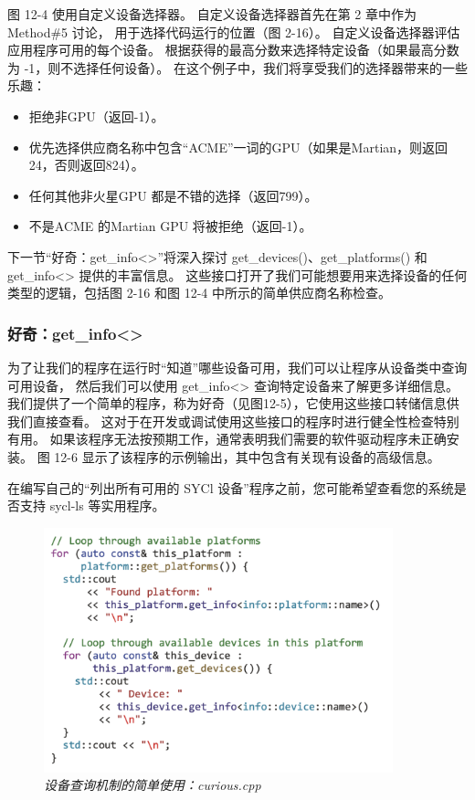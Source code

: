 图 12-4 使用自定义设备选择器。 自定义设备选择器首先在第 2 章中作为 Method\#5 讨论，
用于选择代码运行的位置（图 2-16）。 自定义设备选择器评估应用程序可用的每个设备。 
根据获得的最高分数来选择特定设备（如果最高分数为 -1，则不选择任何设备）。 
在这个例子中，我们将享受我们的选择器带来的一些乐趣：

\begin{itemize}
	\item 拒绝非GPU（返回-1）。

	\item 优先选择供应商名称中包含“ACME”一词的GPU（如果是Martian，则返回24，否则返回824）。

	\item 任何其他非火星GPU 都是不错的选择（返回799）。

	\item 不是ACME 的Martian GPU 将被拒绝（返回-1）。
\end{itemize}

下一节“好奇：get\_info<>”将深入探讨 get\_devices()、get\_platforms() 和 get\_info<> 提供的丰富信息。 
这些接口打开了我们可能想要用来选择设备的任何类型的逻辑，包括图 2-16 和图 12-4 中所示的简单供应商名称检查。

\subsubsection{好奇：get\_info<>}
为了让我们的程序在运行时“知道”哪些设备可用，我们可以让程序从设备类中查询可用设备，
然后我们可以使用 get\_info<> 查询特定设备来了解更多详细信息。 
我们提供了一个简单的程序，称为好奇（见图12-5），它使用这些接口转储信息供我们直接查看。 
这对于在开发或调试使用这些接口的程序时进行健全性检查特别有用。 
如果该程序无法按预期工作，通常表明我们需要的软件驱动程序未正确安装。 
图 12-6 显示了该程序的示例输出，其中包含有关现有设备的高级信息。

\begin{remark}
	在编写自己的“列出所有可用的 SYCl 设备”程序之前，您可能希望查看您的系统是否支持 sycl-ls 等实用程序。
\end{remark}

\begin{figure}[H]
	\centering
	\includegraphics[width=0.9\textwidth]{figs/F12.5.png}
	\caption{\textit{设备查询机制的简单使用：curious.cpp }}
\end{figure}

